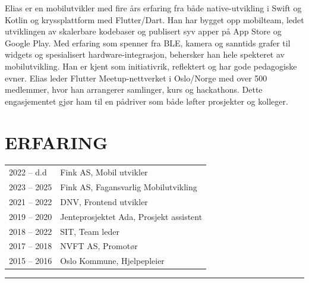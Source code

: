 \documentclass[a4paper,10pt]{article}
\begin{document}
\begin{paracol}{2}
\begin{flushleft}
\begin{tcolorbox}
    Elias er en mobilutvikler med 
    fire års erfaring fra både native-utvikling
     i Swift og Kotlin og kryssplattform med Flutter/Dart.
      Han har bygget opp mobilteam,
       ledet utviklingen av skalerbare
        kodebaser og publisert syv apper 
        på App Store og Google Play. 
        Med erfaring som spenner fra BLE,
         kamera og sanntids grafer til widgets 
         og spesialisert hardware-integrasjon,
          behersker han hele spekteret av
           mobilutvikling.
      Han er kjent som initiativrik, 
      reflektert og har gode pedagogiske evner.
       Elias leder Flutter Meetup-nettverket i 
       Oslo/Norge med over 500 medlemmer,
        hvor han arrangerer samlinger, 
        kurs og hackathons. 
        Dette engasjementet 
        gjør ham til en pådriver som både løfter
         prosjekter og kolleger.
    \end{tcolorbox}
\end{flushleft}

\switchcolumn

\vspace{5em}
\begin{center}
    
\end{center}
\vspace{2em}

 
\section{\ubuntu ERFARING}
\renewcommand{\arraystretch}{1.3} %
\begin{tabularx}{\columnwidth}{@{}lX@{}}
2022 -- d.d & Fink AS, Mobil utvikler \\
2023 -- 2025 & Fink AS, Fagansvarlig Mobilutvikling \\
2021 -- 2022 & DNV, Frontend utvikler \\
2019 -- 2020 & Jenteprosjektet Ada, Prosjekt assistent \\
2018 -- 2022 & SIT, Team leder \\
2017 -- 2018 & NVFT AS, Promotør \\
2015 -- 2016 & Oslo Kommune, Hjelpepleier \\
\end{tabularx}

\vspace{0.5em} 
\noindent\rule{\linewidth}{0.2pt}


\end{paracol}
\end{document}
